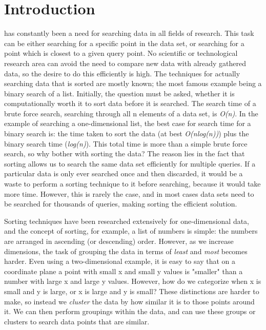 \documentclass[journal]{IEEEtran}
\begin{document}
\section{Introduction}
% 
% 
% 
% 
 has constantly been a need for searching data in all fields of research. This task can be either searching for a specific point in the data set, or searching for a point which is closest to a given query point. No scientific or technological research area can avoid the need to compare new data with already gathered data, so the desire to do this efficiently is high. The techniques for actually searching data that is sorted are mostly known; the most famous example being a binary search of a list. Initially, the question must be asked, whether it is computationally worth it to sort data before it is searched. The search time of a brute force search, searching through all n elements of a data set, is \textit{O(n)}. In the example of searching a one-dimensional list, the best case for search time for a binary search is: the time taken to sort the data (at best \textit{O(nlog(n))}) plus the binary search time (\textit{log(n)}). This total time is more than a simple brute force search, so why bother with sorting the data? The reason lies in the fact that sorting allows us to search the same data set efficiently for multiple queries. If a particular data is only ever searched once and then discarded, it would be a waste to perform a sorting technique to it before searching, because it would take more time. However, this is rarely the case, and in most cases data sets need to be searched for thousands of queries, making sorting the efficient solution.\par

Sorting techniques have been researched extensively for one-dimensional data, and the concept of sorting, for example, a list of numbers is simple: the numbers are arranged in ascending (or descending) order. However, as we increase dimensions, the task of grouping the data in terms of \textit{least} and \textit{most} becomes harder. Even using a two-dimensional example, it is easy to say that on a coordinate plane a point with small x and small y values is "smaller" than a number with large x and large y values. However, how do we categorize when x is small and y is large, or x is large and y is small? These distinctions are harder to make, so instead we \textit{cluster} the data by how similar it is to those points around it. We can then perform groupings within the data, and can use these groups or clusters to search data points that are similar. \par
\end{document}
